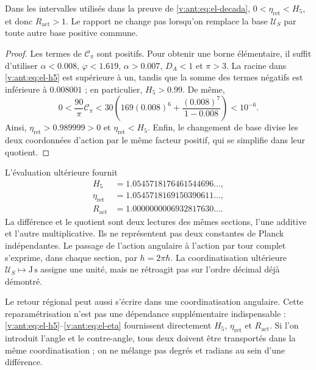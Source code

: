 \begin{proposition}
Dans les intervalles utilisés dans la preuve de \eqref{v:ant:eq:el-decada},
\(0<\eta_{\mathrm{ret}}<H_5\), et donc
\(R_{\mathrm{act}}>1\). Le rapport ne change pas lorsqu'on remplace la base
\(\mathcal U_S\) par toute autre base positive commune.
\end{proposition}
\begin{proof}
Les termes de \(\mathcal C_\pi\) sont positifs. Pour obtenir une borne
élémentaire, il suffit d'utiliser \(\alpha<0.008\), \(\varphi<1.619\),
\(\alpha>0.007\), \(D_A<1\) et \(\pi>3\). La racine dans
\eqref{v:ant:eq:el-h5} est supérieure à un, tandis que la somme des termes
négatifs est inférieure à \(0.008001\) ; en particulier, \(H_5>0.99\).
De même,
\[
 0<\frac{90}{\pi}\mathcal C_\pi
 <30\left(169(0.008)^6+
           \frac{(0.008)^7}{1-0.008}\right)<10^{-6}.
\]
Ainsi, \(\eta_{\mathrm{ret}}>0.989999>0\) et
\(\eta_{\mathrm{ret}}<H_5\). Enfin, le changement de base divise
les deux coordonnées d'action par le même facteur positif, qui se simplifie dans
leur quotient.
\end{proof}

L'évaluation ultérieure fournit
\begin{align*}
 H_5&=1.0545718176461544696\ldots,\\
 \eta_{\mathrm{ret}}&=1.0545718169150390611\ldots,\\
 R_{\mathrm{act}}&=1.0000000006932817630\ldots.
\end{align*}
La différence et le quotient sont deux lectures des mêmes sections,
l'une additive et l'autre multiplicative. Ils ne représentent pas deux constantes de
Planck indépendantes. Le passage de l'action angulaire à l'action par tour
complet s'exprime, dans chaque section, par
\(h=2\pi\hbar\). La coordinatisation ultérieure
\(\mathcal U_S\mapsto\mathrm{J\,s}\) assigne une unité, mais ne
rétroagit pas sur l'ordre décimal déjà démontré.

Le retour régional peut aussi s'écrire dans une coordinatisation angulaire.
Cette reparamétrisation n'est pas une dépendance supplémentaire indispensable :
\eqref{v:ant:eq:el-h5}--\eqref{v:ant:eq:el-eta} fournissent directement
\(H_5\), \(\eta_{\mathrm{ret}}\) et \(R_{\mathrm{act}}\). Si l'on
introduit l'angle et le contre-angle, tous deux doivent être transportés dans la même
coordinatisation ; on ne mélange pas degrés et radians au sein d'une différence.


